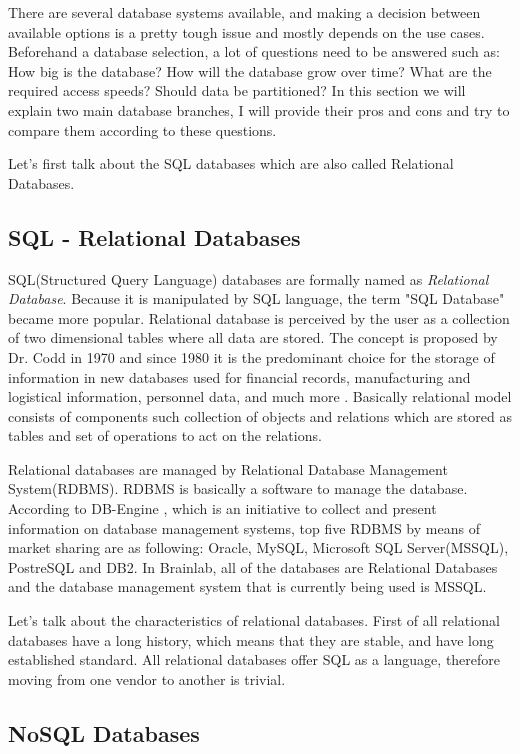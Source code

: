 \documentclass{article}
\begin{document}
There are several database systems available, and making a decision between available options is a pretty tough issue and mostly depends on the use cases. Beforehand a database selection, a lot of questions need to be answered such as: How big is the database? How will the database grow over time? What are the required access speeds? Should data be partitioned? In this section we will explain two main database branches, I will provide their pros and cons and try to compare them according to these questions.

Let's first talk about the SQL databases which are also called Relational Databases. 

\subsection{SQL - Relational Databases}
SQL(Structured Query Language) databases are formally named as \emph{Relational Database}. Because it is manipulated by SQL language, the term "SQL Database" became more popular. Relational database is perceived by the user as a collection of two dimensional tables where all data are stored. The concept is proposed by Dr. Codd in 1970 and since 1980 it is the predominant choice for the storage of information in new databases used for financial records, manufacturing and logistical information, personnel data, and much more \cite{online1}. Basically relational model consists of components such collection of objects and relations which are stored as tables and set of operations to act on the relations.

Relational databases are managed by Relational Database Management System(RDBMS). RDBMS is basically a software to manage the database.  According to DB-Engine \cite{online2}, which is an initiative to collect and present information on database management systems, top five RDBMS by means of market sharing are as following: Oracle, MySQL, Microsoft SQL Server(MSSQL), PostreSQL and DB2. In Brainlab, all of the databases are Relational Databases and the database management system that is currently being used is MSSQL.

Let's talk about the characteristics of relational databases. First of all relational databases have a long history, which means that they are stable, and have long established standard. All relational databases offer SQL as a language, therefore moving from one vendor to another is trivial. 

\subsection{NoSQL Databases}
\end{document}
